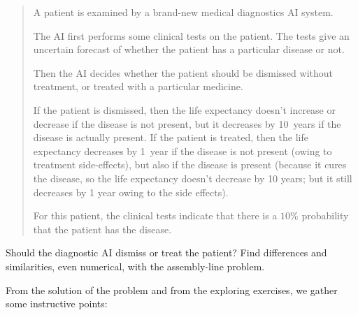 \documentclass[
  a4paper,
  DIV=11,
  numbers=noendperiod,
  oneside]{scrreprt}
\begin{document}
\begin{tcolorbox}
\begin{enumerate}
  \begin{quote}
  A patient is examined by a brand-new medical diagnostics AI system.

  The AI first performs some clinical tests on the patient. The tests
  give an uncertain forecast of whether the patient has a particular
  disease or not.

  Then the AI decides whether the patient should be dismissed without
  treatment, or treated with a particular medicine.

  If the patient is dismissed, then the life expectancy doesn't increase
  or decrease if the disease is not present, but it decreases by
  10~years if the disease is actually present. If the patient is
  treated, then the life expectancy decreases by 1~year if the disease
  is not present (owing to treatment side-effects), but also if the
  disease is present (because it cures the disease, so the life
  expectancy doesn't decrease by 10 years; but it still decreases by 1
  year owing to the side effects).

  For this patient, the clinical tests indicate that there is a \(10\%\)
  probability that the patient has the disease.
  \end{quote}

  Should the diagnostic AI dismiss or treat the patient? Find
  differences and similarities, even numerical, with the assembly-line
  problem.
\end{enumerate}

\end{tcolorbox}

\hfill\break

From the solution of the problem and from the exploring exercises, we
gather some instructive points:
\end{document}
